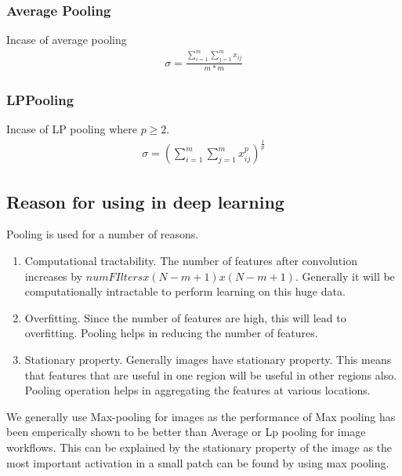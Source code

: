 \documentclass{article}
\begin{document}
\subsubsection{Average Pooling}
Incase of average pooling
\begin{align*}
  \sigma = \frac{\sum_{i=1}^{m} \sum_{j=1}^{m} x_{ij}}{m*m}
\end{align*}

\subsubsection{LPPooling}
Incase of LP pooling where $p \ge 2$.
\begin{align*}
  \sigma = {(\sum_{i=1}^{m}\sum_{j=1}^{m} x_{ij}^{p} )}^{\frac{1}{p}}
\end{align*}

\subsection{Reason for using in deep learning}
Pooling is used for a number of reasons.
\begin{enumerate}
  \item Computational tractability.  The number of features after convolution increases by $numFIlters x (N-m+1) x (N-m+1)$.  Generally it will be computationally intractable to perform learning on this huge data.
  \item Overfitting.  Since the number of features are high, this will lead to overfitting.  Pooling helps in reducing the number of features.
  \item Stationary property.  Generally images have stationary property.  This means that features that are useful in one region will be useful in other regions also.  Pooling operation helps in aggregating the features at various locations.
\end{enumerate}

We generally use Max-pooling for images as the performance of Max pooling has been emperically shown to be better than Average or Lp pooling for image workflows.  This can be explained by the stationary property of the image as the most important activation in a small patch can be found by using max pooling.
\end{document}
